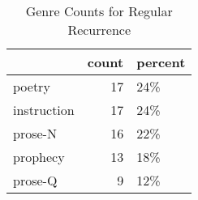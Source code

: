 \begin{table}[htbp!]
\centering
\caption{Genre Counts for Regular Recurrence}
\label{table:regrec_gen_cp}
\begin{tabular}{lrl}
\toprule
{} &  count & percent \\
\midrule
poetry      &     17 &     24\% \\
instruction &     17 &     24\% \\
prose-N     &     16 &     22\% \\
prophecy    &     13 &     18\% \\
prose-Q     &      9 &     12\% \\
\bottomrule
\end{tabular}
\end{table}
